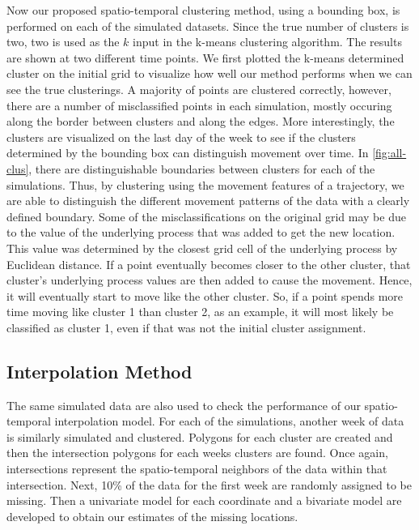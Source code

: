 \documentclass[12pt]{article}
\begin{document}
Now our proposed spatio-temporal clustering method, using a bounding
box, is performed on each of the simulated datasets. Since the true
number of clusters is two, two is used as the \(k\) input in the k-means
clustering algorithm. The results are shown at two different time
points. We first plotted the k-means determined cluster on the initial
grid to visualize how well our method performs when we can see the true
clusterings. A majority of points are clustered correctly, however,
there are a number of misclassified points in each simulation, mostly
occuring along the border between clusters and along the edges. More
interestingly, the clusters are visualized on the last day of the week
to see if the clusters determined by the bounding box can distinguish
movement over time. In \cref{fig:all-clus}, there are distinguishable
boundaries between clusters for each of the simulations. Thus, by
clustering using the movement features of a trajectory, we are able to
distinguish the different movement patterns of the data with a clearly
defined boundary. Some of the misclassifications on the original grid
may be due to the value of the underlying process that was added to get
the new location. This value was determined by the closest grid cell of
the underlying process by Euclidean distance. If a point eventually
becomes closer to the other cluster, that cluster's underlying process
values are then added to cause the movement. Hence, it will eventually
start to move like the other cluster. So, if a point spends more time
moving like cluster 1 than cluster 2, as an example, it will most likely
be classified as cluster 1, even if that was not the initial cluster
assignment.

\hypertarget{interpolation-method}{%
\subsection{Interpolation Method}\label{interpolation-method}}

The same simulated data are also used to check the performance of our
spatio-temporal interpolation model. For each of the simulations,
another week of data is similarly simulated and clustered. Polygons for
each cluster are created and then the intersection polygons for each
weeks clusters are found. Once again, intersections represent the
spatio-temporal neighbors of the data within that intersection. Next,
10\% of the data for the first week are randomly assigned to be missing.
Then a univariate model for each coordinate and a bivariate model are
developed to obtain our estimates of the missing locations.
\end{document}
